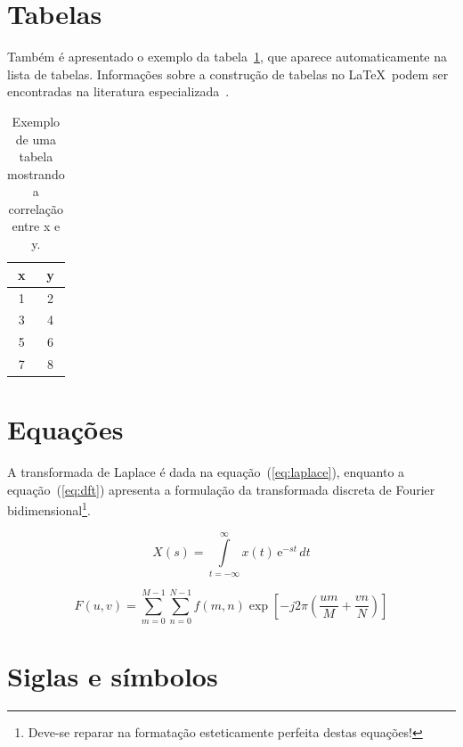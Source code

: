 \section{Tabelas}

Tamb\'em \'e apresentado o exemplo da tabela~\ref{tab:correlacao}, que aparece automaticamente na lista de tabelas. Informa\c{c}\~oes sobre a constru\c{c}\~ao de tabelas no \LaTeX\ podem ser encontradas na literatura especializada~\cite{Lamport1986,Buerger1989,Kopka2003,Mittelbach2004}.

\begin{table}[!htb]
	\centering
	\caption[Exemplo de uma tabela]{Exemplo de uma tabela mostrando a correla\c{c}\~ao entre x e y.}
	\label{tab:correlacao}
	\begin{tabular}{cc}
		\hline 
		x & y \\
		\hline
		1 & 2 \\
		3 & 4 \\
		5 & 6 \\
		7 & 8 \\
		\hline 
	\end{tabular}
\end{table}

\section{Equa\c{c}\~oes}

A transformada de Laplace \'e dada na equa\c{c}\~ao~(\ref{eq:laplace}), enquanto a equa\c{c}\~ao~(\ref{eq:dft}) apresenta a formula\c{c}\~ao da transformada discreta de Fourier bidimensional\footnote{Deve-se reparar na formata\c{c}\~ao esteticamente perfeita destas equa\c{c}\~oes!}.

\begin{equation}
X(s) = \int\limits_{t = -\infty}^{\infty} x(t) \, \text{e}^{-st} \, dt
\label{eq:laplace}
\end{equation}

\begin{equation}
F(u, v) = \sum_{m = 0}^{M - 1} \sum_{n = 0}^{N - 1} f(m, n) \exp \left[ -j 2 \pi \left( \frac{u m}{M} + \frac{v n}{N} \right) \right]
\label{eq:dft}
\end{equation}

\section{Siglas e s\'imbolos}

